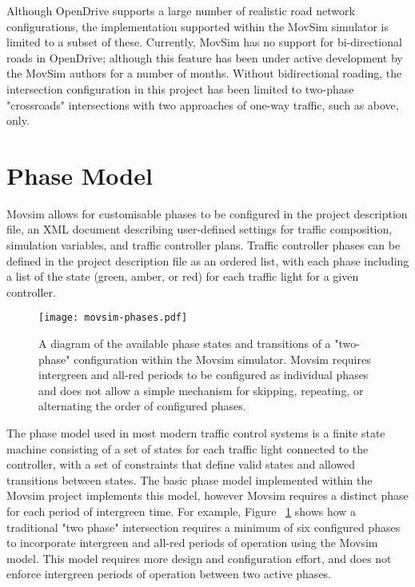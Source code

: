 
Although OpenDrive supports a large number of realistic road network configurations, the implementation supported within the MovSim simulator is limited to a subset of these. Currently, MovSim has no support for bi-directional roads in OpenDrive; although this feature has been under active development by the MovSim authors for a number of months. Without bidirectional roading, the intersection configuration in this project has been limited to two-phase "crossroads" intersections with two approaches of one-way traffic, such as above, only. 

\section{Phase Model}

Movsim allows for customisable phases to be configured in the project description file, an XML document describing user-defined settings for traffic composition, simulation variables, and traffic controller plans. Traffic controller phases can be defined in the project description file as an ordered list, with each phase including a list of the state (green, amber, or red) for each traffic light for a given controller. 

\begin{figure}[]
\centering
	\texttt{[image: movsim-phases.pdf]}
	\caption{ A diagram of the available phase states and transitions of a "two-phase" configuration within the Movsim simulator. Movsim requires intergreen and all-red periods to be configured as individual phases and does not allow a simple mechanism for skipping, repeating, or alternating the order of configured phases. }
\label{movsimphasediagram}
\end{figure}

The phase model used in most modern traffic control systems is a finite state machine consisting of a set of states for each traffic light connected to the controller, with a set of constraints that define valid states and allowed transitions between states. The basic phase model implemented within the Movsim project implements this model, however Movsim requires a distinct phase for each period of intergreen time. For example, Figure ~\ref{movsimphasediagram} shows how a traditional "two phase" intersection requires a minimum of six configured phases to incorporate intergreen and all-red periods of operation using the Movsim model. This model requires more design and configuration effort, and does not enforce intergreen periods of operation between two active phases.

